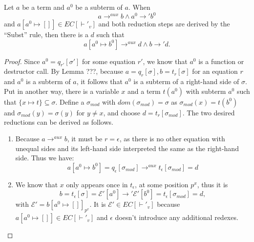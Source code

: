 \begin{lemma}
Let $a$ be a term and $a^0$ be a subterm of $a$. When
\[
a \longrightarrow^{aux} b \land a^0 \longrightarrow' b^0
\]
and $a[a^0 \mapsto []] \in EC[\vdash'_v]$ and both reduction steps are derived by the ``Subst'' rule, then there is a $d$ such that
\[
a[a^0 \mapsto b^0] \longrightarrow^{aux} d \land b \longrightarrow' d.
\]

\begin{proof}
Since $a^0 = q_{r'}[\sigma']$ for some equation $r'$, we know that $a^0$ is a function or destructor call. By Lemma ???, because $a = q_r[\sigma], b = t_r[\sigma]$ for an equation $r$ and $a^0$ is a subterm of $a$, it follows that $a^0$ is a subterm of a right-hand side of $\sigma$. Put in another way, there is a variable $x$ and a term $t(a^0)$ with subterm $a^0$ such that $\{x \mapsto t\} \subseteq \sigma$. Define a $\sigma_{mod}$ with $dom(\sigma_{mod}) = \sigma$ as $\sigma_{mod}(x) = t(b^0)$ and $\sigma_{mod}(y) = \sigma(y)$ for $y \neq x$, and choose $d = t_r[\sigma_{mod}]$. The two desired reductions can be derived as follows.
\begin{enumerate}
\item Because $a \longrightarrow^{aux} b$, it must be $r = \epsilon$, as there is no other equation with unequal sides and its left-hand side interpreted the same as the right-hand side. Thus we have:
\[
a[a^0 \mapsto b^0] = q_\epsilon[\sigma_{mod}] \longrightarrow^{aux} t_\epsilon[\sigma_{mod}] = d
\]

\item
We know that $x$ only appears once in $t_\epsilon$, at some position $p^x$, thus it is
\[
b = t_\epsilon[\sigma] = \mathcal{E}'[a^0] \longrightarrow' \mathcal{E}'[b^0] = t_\epsilon[\sigma_{mod}] = d,
\]
with $\mathcal{E}' = b[a^0 \mapsto []]_{p^x}$. It is $\mathcal{E}' \in EC[\vdash'_v]$ because $a[a^0 \mapsto []] \in EC[\vdash'_v]$ and $\epsilon$ doesn't introduce any additional redexes.

\end{enumerate}
\end{proof}
\end{lemma}

